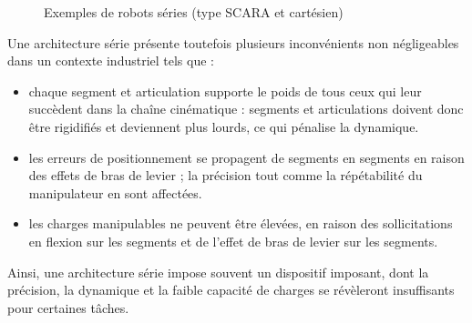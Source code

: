\begin{figure}[!ht]
  \centering
\hfill
    \caption{\footnotesize{Exemples de robots séries (type SCARA et 
cart\'esien)}}
\label{intro:fig2}
\end{figure}

Une architecture série présente toutefois plusieurs inconvénients non 
négli\-gea\-bles dans un contexte industriel tels que :
\begin{itemize}
 \item chaque segment et articulation supporte le poids de tous ceux qui leur 
succèdent dans la chaîne cinématique : segments et articulations doivent donc 
être rigidifiés et deviennent plus lourds, ce qui pénalise la dynamique.
 \item les erreurs de positionnement se propagent de segments en segments en 
raison des effets de bras de levier ; la précision tout comme la répétabilité du 
manipulateur en sont affectées.
 \item les charges manipulables ne peuvent être \'elev\'ees, en raison des 
sollicitations en flexion sur les segments et de l'effet de bras de levier sur 
les segments.
\end{itemize}

Ainsi, une architecture série impose souvent un dispositif imposant, dont la 
précision, la dynamique et la faible capacité de charges se révèleront 
insuffisants pour certaines tâches.

